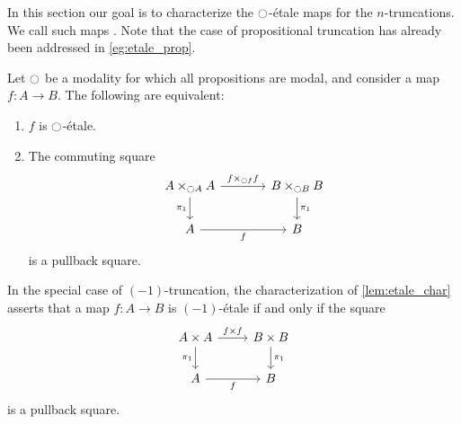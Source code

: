 In this section our goal is to characterize the ${\ocircle}$-\'etale maps for the $n$-truncations. We call such maps . Note that the case of propositional truncation has already been addressed in \cref{eg:etale_prop}.

\begin{lem}\label{lem:etale_char}
Let ${\ocircle}$ be a modality for which all propositions are modal, and consider a map $f:A\to B$. The following are equivalent:
\begin{enumerate}
\item $f$ is ${\ocircle}$-\'etale.
\item The commuting square
\begin{equation*}
\begin{tikzcd}[column sep=large]
A\times_{\modal A} A \arrow[d,swap,"\pi_1"] \arrow[r,"{f\times_{\modal f} f}"] & B\times_{\modal B} B \arrow[d,"\pi_1"] \\
A \arrow[r,swap,"f"] & B
\end{tikzcd}
\end{equation*}
is a pullback square.
\end{enumerate}
\end{lem}

\begin{rmk}
In the special case of $(-1)$-truncation, the characterization of \cref{lem:etale_char} asserts that a map $f:A\to B$ is $(-1)$-\'etale if and only if the square
\begin{equation*}
\begin{tikzcd}
A\times A \arrow[d,swap,"\pi_1"] \arrow[r,"{f\times f}"] & B\times B \arrow[d,"\pi_1"] \\
A \arrow[r,swap,"f"] & B
\end{tikzcd}
\end{equation*}
is a pullback square.
\end{rmk}

